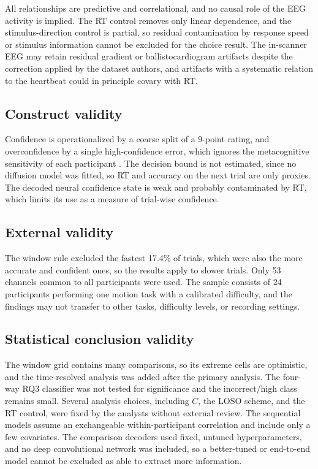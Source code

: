 \documentclass[11pt,a4paper]{article}
\begin{document}
All relationships are predictive and correlational, and no causal role of the EEG activity is implied. The RT control removes only linear dependence, and the stimulus-direction control is partial, so residual contamination by response speed or stimulus information cannot be excluded for the choice result. The in-scanner EEG may retain residual gradient or ballistocardiogram artifacts despite the correction applied by the dataset authors, and artifacts with a systematic relation to the heartbeat could in principle covary with RT.

\subsection{Construct validity}

Confidence is operationalized by a coarse split of a 9-point rating, and overconfidence by a single high-confidence error, which ignores the metacognitive sensitivity of each participant \cite{r19}. The decision bound is not estimated, since no diffusion model was fitted, so RT and accuracy on the next trial are only proxies. The decoded neural confidence state is weak and probably contaminated by RT, which limits its use as a measure of trial-wise confidence.

\subsection{External validity}

The window rule excluded the fastest 17.4\% of trials, which were also the more accurate and confident ones, so the results apply to slower trials. Only 53 channels common to all participants were used. The sample consists of 24 participants performing one motion task with a calibrated difficulty, and the findings may not transfer to other tasks, difficulty levels, or recording settings.

\subsection{Statistical conclusion validity}

The window grid contains many comparisons, so its extreme cells are optimistic, and the time-resolved analysis was added after the primary analysis. The four-way RQ3 classifier was not tested for significance and the incorrect/high class remains small. Several analysis choices, including $C$, the LOSO scheme, and the RT control, were fixed by the analysts without external review. The sequential models assume an exchangeable within-participant correlation and include only a few covariates. The comparison decoders used fixed, untuned hyperparameters, and no deep convolutional network was included, so a better-tuned or end-to-end model cannot be excluded as able to extract more information.
\end{document}
